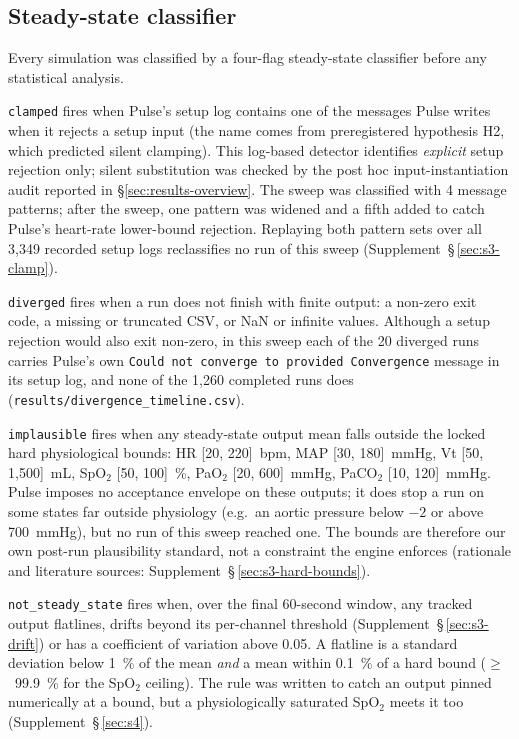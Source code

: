 \documentclass[pdflatex,sn-nature]{sn-jnl}%
\begin{document}
\subsection{Steady-state classifier}\label{sec:methods-detector}

Every simulation was classified by a four-flag steady-state classifier before any statistical analysis.

\texttt{clamped} fires when Pulse's setup log contains one of the messages Pulse writes when it rejects a setup input (the name comes from preregistered hypothesis H2, which predicted silent clamping). This log-based detector identifies \emph{explicit} setup rejection only; silent substitution was checked by the post hoc input-instantiation audit reported in \S\ref{sec:results-overview}. The sweep was classified with 4 message patterns; after the sweep, one pattern was widened and a fifth added to catch Pulse's heart-rate lower-bound rejection. Replaying both pattern sets over all 3{,}349 recorded setup logs reclassifies no run of this sweep (Supplement~\S\,\ref{sec:s3-clamp}).

\texttt{diverged} fires when a run does not finish with finite output: a non-zero exit code, a missing or truncated CSV, or NaN or infinite values. Although a setup rejection would also exit non-zero, in this sweep each of the 20 diverged runs carries Pulse's own \texttt{Could not converge to provided Convergence} message in its setup log, and none of the 1{,}260 completed runs does (\texttt{results/divergence\_timeline.csv}).

\texttt{implausible} fires when any steady-state output mean falls outside the locked hard physiological bounds: HR [20, 220]~bpm, MAP [30, 180]~mmHg, Vt [50, 1{,}500]~mL, SpO$_2$ [50, 100]~\%, PaO$_2$ [20, 600]~mmHg, PaCO$_2$ [10, 120]~mmHg. Pulse imposes no acceptance envelope on these outputs; it does stop a run on some states far outside physiology (e.g.\ an aortic pressure below $-2$ or above 700~mmHg), but no run of this sweep reached one. The bounds are therefore our own post-run plausibility standard, not a constraint the engine enforces (rationale and literature sources: Supplement~\S\,\ref{sec:s3-hard-bounds}).

\texttt{not\_steady\_state} fires when, over the final 60-second window, any tracked output flatlines, drifts beyond its per-channel threshold (Supplement~\S\,\ref{sec:s3-drift}) or has a coefficient of variation above 0.05. A flatline is a standard deviation below 1~\% of the mean \emph{and} a mean within 0.1~\% of a hard bound ($\geq$~99.9~\% for the SpO$_2$ ceiling). The rule was written to catch an output pinned numerically at a bound, but a physiologically saturated SpO$_2$ meets it too (Supplement~\S\,\ref{sec:s4}).
\end{document}
